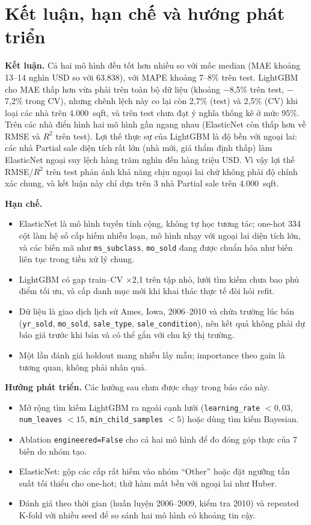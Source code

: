 \section{Kết luận, hạn chế và hướng phát triển}
\label{sec:conclusion-b}

\textbf{Kết luận.} Cả hai mô hình đều tốt hơn nhiều so với mốc median (MAE khoảng 13--14 nghìn USD so với 63.838),
với MAPE khoảng 7--8\% trên test. LightGBM cho MAE thấp hơn vừa phải trên toàn bộ dữ liệu (khoảng $-$8,5\% trên
test, $-$7,2\% trong CV), nhưng chênh lệch này co lại còn 2,7\% (test) và 2,5\% (CV) khi loại các nhà trên
4.000~sqft, và trên test chưa đạt ý nghĩa thống kê ở mức 95\%. Trên các nhà điển hình hai mô hình gần ngang nhau
(ElasticNet còn thấp hơn về RMSE và $R^2$ trên test). Lợi thế thực sự của LightGBM là độ bền với ngoại lai: các
nhà Partial sale diện tích rất lớn (nhà mới, giá thẩm định thấp) làm ElasticNet ngoại suy lệch hàng trăm nghìn đến
hàng triệu USD. Vì vậy lợi thế RMSE/$R^2$ trên test phản ánh khả năng chịu ngoại lai chứ không phải độ chính xác
chung, và kết luận này chỉ dựa trên 3 nhà Partial sale trên 4.000~sqft.

\textbf{Hạn chế.}
\begin{itemize}
  \item ElasticNet là mô hình tuyến tính cộng, không tự học tương tác; one-hot 334 cột làm hệ số cấp hiếm nhiễu
    loạn, mô hình nhạy với ngoại lai diện tích lớn, và các biến mã như \texttt{ms\_subclass}, \texttt{mo\_sold} đang
    được chuẩn hóa như biến liên tục trong tiền xử lý chung.
  \item LightGBM có gap train--CV $\times$2,1 trên tập nhỏ, lưới tìm kiếm chưa bao phủ điểm tối ưu, và cấp danh mục
    mới khi khai thác thực tế đòi hỏi refit.
  \item Dữ liệu là giao dịch lịch sử Ames, Iowa, 2006--2010 và chứa trường lúc bán (\texttt{yr\_sold},
    \texttt{mo\_sold}, \texttt{sale\_type}, \texttt{sale\_condition}), nên kết quả không phải dự báo giá trước khi
    bán và có thể gắn với chu kỳ thị trường.
  \item Một lần đánh giá holdout mang nhiễu lấy mẫu; importance theo gain là tương quan, không phải nhân quả.
\end{itemize}

\textbf{Hướng phát triển.} Các hướng sau chưa được chạy trong báo cáo này.
\begin{itemize}
  \item Mở rộng tìm kiếm LightGBM ra ngoài cạnh lưới (\texttt{learning\_rate} $<0{,}03$, \texttt{num\_leaves}
    $<15$, \texttt{min\_child\_samples} $<5$) hoặc dùng tìm kiếm Bayesian.
  \item Ablation \texttt{engineered=False} cho cả hai mô hình để đo đóng góp thực của 7 biến do nhóm tạo.
  \item ElasticNet: gộp các cấp rất hiếm vào nhóm ``Other'' hoặc đặt ngưỡng tần suất tối thiểu cho one-hot; thử
    hàm mất bền với ngoại lai như Huber.
  \item Đánh giá theo thời gian (huấn luyện 2006--2009, kiểm tra 2010) và repeated K-fold với nhiều seed để so sánh
    hai mô hình có khoảng tin cậy.
\end{itemize}

